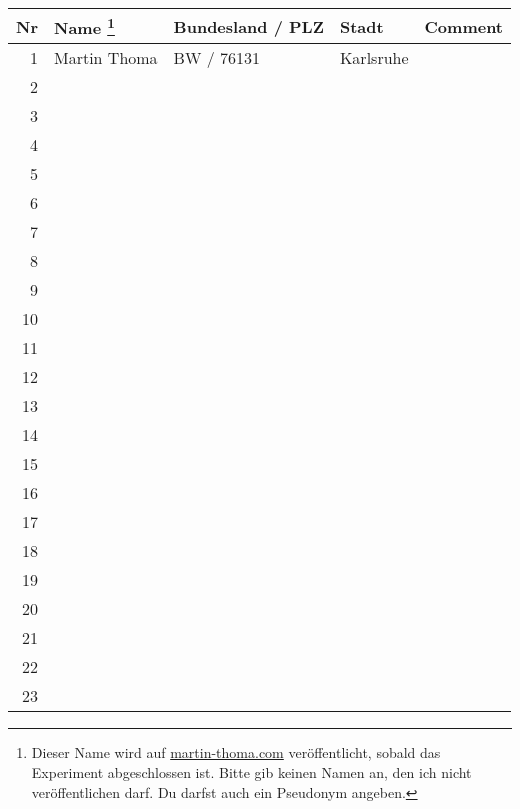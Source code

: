 \documentclass[11pt,a4paper,oneside,landscape]{scrartcl}
\begin{document}
\begin{minipage*}{6cm}
\begin{tabular}{r || p{5cm} | p{4cm} | p{5cm} | p{10cm}}
    Nr & Name \footnote{Dieser Name wird auf \href{http://martin-thoma.com}{martin-thoma.com} veröffentlicht, sobald das Experiment abgeschlossen ist. Bitte gib keinen Namen an, den ich nicht veröffentlichen darf. Du darfst auch ein Pseudonym angeben.}   & Bundesland / PLZ & Stadt & Comment\\
    \hline
    \hline
1 & Martin Thoma & BW / 76131 & Karlsruhe\\
\hline
2 & & &\\
\hline
3 & & &\\
\hline
4 & & &\\
\hline
5 & & &\\
\hline
6 & & &\\
\hline
7 & & &\\
\hline
8 & & &\\
\hline
9 & & &\\
\hline
10 & & &\\
\hline
11 & & &\\
\hline
12 & & &\\
\hline
13 & & &\\
\hline
14 & & &\\
\hline
15 & & &\\
\hline
16 & & &\\
\hline
17 & & &\\
\hline
18 & & &\\
\hline
19 & & &\\
\hline
20 & & &\\
\hline
21 & & &\\
\hline
22 & & &\\
\hline
23 & & &\\
\hline
\end{tabular}
\end{minipage*}
\end{document}

